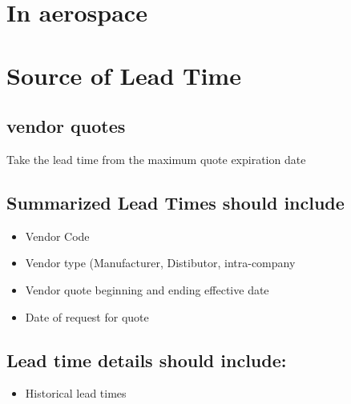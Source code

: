 \documentclass[letterpaper,10pt,english]{sphinxmanual}
\begin{document}
\section{In aerospace}
\label{Questions:in-aerospace}

\section{Source of Lead Time}
\label{Questions:source-of-lead-time}

\subsection{vendor quotes}
\label{Questions:vendor-quotes}
Take the lead time from the maximum quote expiration date


\subsection{Summarized Lead Times should include}
\label{Questions:summarized-lead-times-should-include}\begin{itemize}
\item {} 
Vendor Code

\item {} 
Vendor type (Manufacturer, Distibutor, intra-company

\item {} 
Vendor quote beginning and ending effective date

\item {} 
Date of request for quote

\end{itemize}


\subsection{Lead time details should include:}
\label{Questions:lead-time-details-should-include}\begin{itemize}
\item {} 
Historical lead times

\end{itemize}
\end{document}
